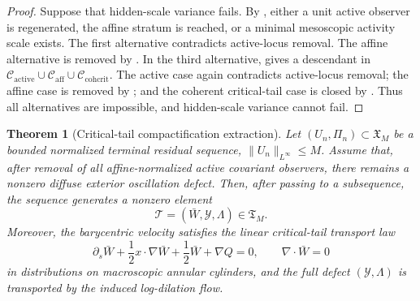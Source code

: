 \documentclass[11pt]{amsart}
\numberwithin{equation}{section}
\theoremstyle{plain}
\newtheorem{theorem}{Theorem}[section]
\theoremstyle{definition}
\theoremstyle{remark}
\newcommand{\Cactive}{\mathcal C_{\mathrm{active}}}
\newcommand{\Caff}{\mathcal C_{\mathrm{aff}}}
\newcommand{\Ccohcrit}{\mathcal C_{\mathrm{cohcrit}}}
\newcommand{\Tcrit}{\mathfrak T_M}
\begin{document}
\begin{proof}
Suppose that hidden-scale variance fails.  By
, either a unit active observer is
regenerated, the affine stratum is reached, or a minimal mesoscopic activity scale
exists.  The first alternative contradicts active-locus removal.  The affine
alternative is removed by .  In the
third alternative,
 gives a descendant in
\(\Cactive\cup\Caff\cup\Ccohcrit\).  The active case again contradicts
active-locus removal; the affine case is removed by
; and the coherent critical-tail
case is closed by .  Thus all
alternatives are impossible, and hidden-scale variance cannot fail.
\end{proof}

\begin{theorem}[Critical-tail compactification extraction]
\label{thm:critical-tail-compactification-extraction}
Let \((U_n,\Pi_n)\subset\mathfrak X_M\) be a bounded normalized terminal
residual sequence, \(\|U_n\|_{L^\infty}\le M\).  Assume that, after removal of
all affine-normalized active covariant observers, there remains a nonzero
diffuse exterior oscillation defect.  Then, after passing to a subsequence, the
sequence generates a nonzero element
\[
   \mathcal T=(\bar W,\mathcal Y,\Lambda)\in\Tcrit .
\]
Moreover, the barycentric velocity satisfies the linear critical-tail transport
law
\[
   \partial_s\bar W+\frac12 x\cdot\nabla\bar W+\frac12\bar W+\nabla Q=0,
   \qquad
   \nabla\cdot\bar W=0
\]
in distributions on macroscopic annular cylinders, and the full defect
\((\mathcal Y,\Lambda)\) is transported by the induced log-dilation flow.
\end{theorem}
\end{document}
